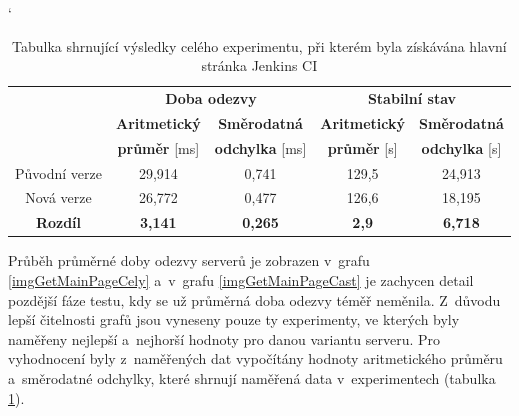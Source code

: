             \begin{table}[h!t]
             \catcode`
             \begin{adjustwidth}{-0.5cm}{}
             \begin{center}
              \begin{tabular}{| c || c | c || c | c |} \hline
                \multirow{3}{*}{}   &    \multicolumn{2}{c||}{\textbf{Doba odezvy}}  &  \multicolumn{2}{c|}{\textbf{Stabilní stav}}\\ \cline{2-5}
                 & \textbf{Aritmetický}  &  \textbf{Směrodatná}  &  \textbf{Aritmetický} &  \textbf{Směrodatná}\\ 
                 & \textbf{průměr} [ms]  &  \textbf{odchylka} [ms]  &  \textbf{průměr} [s]  &  \textbf{odchylka} [s]\\ \hline
                Původní verze & 29,914 &  0,741 &  129,5 &  24,913 \\\hline
                Nová verze & 26,772 &  0,477 &  126,6 &  18,195\\\hline
                \textbf{Rozdíl} &  \textbf{3,141}  &  \textbf{0,265}  &  \textbf{2,9}  &  \textbf{6,718}\\\hline  
              \end{tabular}
              \caption{Tabulka shrnující výsledky celého experimentu, při kterém byla získávána hlavní stránka Jenkins CI}
              \label{tabMainPageFinal}
             \end{center}
             \end{adjustwidth}
            \end{table}

            Průběh průměrné doby odezvy serverů je zobrazen v~grafu \ref{imgGetMainPageCely} a~v~grafu
            \ref{imgGetMainPageCast} je zachycen detail pozdější fáze testu, kdy se už průměrná doba odezvy téměř neměnila.
            Z~důvodu lepší čitelnosti grafů jsou vyneseny pouze ty experimenty, ve kterých byly naměřeny nejlepší a~nejhorší hodnoty
            pro danou variantu serveru.
            Pro vyhodnocení byly z~naměřených dat vypočítány hodnoty aritmetického průměru a~směrodatné odchylky,
            které shrnují naměřená data v~experimentech (tabulka \ref{tabMainPageFinal}).

